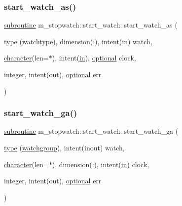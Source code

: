 \subsubsection{\texorpdfstring{start\+\_\+watch\+\_\+as()}{start\_watch\_as()}}
{\footnotesize\ttfamily \hyperlink{M__stopwatch_83_8txt_acfbcff50169d691ff02d4a123ed70482}{subroutine} m\+\_\+stopwatch\+::start\+\_\+watch\+::start\+\_\+watch\+\_\+as (\begin{DoxyParamCaption}\item[{\hyperlink{stop__watch_83_8txt_a70f0ead91c32e25323c03265aa302c1c}{type} (\hyperlink{structm__stopwatch_1_1watchtype}{watchtype}), dimension(\+:), intent(\hyperlink{M__journal_83_8txt_afce72651d1eed785a2132bee863b2f38}{in})}]{watch,  }\item[{\hyperlink{option__stopwatch_83_8txt_abd4b21fbbd175834027b5224bfe97e66}{character}(len=$\ast$), intent(\hyperlink{M__journal_83_8txt_afce72651d1eed785a2132bee863b2f38}{in}), \hyperlink{option__stopwatch_83_8txt_aa4ece75e7acf58a4843f70fe18c3ade5}{optional}}]{clock,  }\item[{integer, intent(out), \hyperlink{option__stopwatch_83_8txt_aa4ece75e7acf58a4843f70fe18c3ade5}{optional}}]{err }\end{DoxyParamCaption})\hspace{0.3cm}{\ttfamily [private]}}

\mbox{\label{interfacem__stopwatch_1_1start__watch_ae147538e6da5f0485b4b253baafebd3e}} 
\subsubsection{\texorpdfstring{start\+\_\+watch\+\_\+ga()}{start\_watch\_ga()}}
{\footnotesize\ttfamily \hyperlink{M__stopwatch_83_8txt_acfbcff50169d691ff02d4a123ed70482}{subroutine} m\+\_\+stopwatch\+::start\+\_\+watch\+::start\+\_\+watch\+\_\+ga (\begin{DoxyParamCaption}\item[{\hyperlink{stop__watch_83_8txt_a70f0ead91c32e25323c03265aa302c1c}{type} (\hyperlink{structm__stopwatch_1_1watchgroup}{watchgroup}), intent(inout)}]{watch,  }\item[{\hyperlink{option__stopwatch_83_8txt_abd4b21fbbd175834027b5224bfe97e66}{character}(len=$\ast$), dimension(\+:), intent(\hyperlink{M__journal_83_8txt_afce72651d1eed785a2132bee863b2f38}{in})}]{clock,  }\item[{integer, intent(out), \hyperlink{option__stopwatch_83_8txt_aa4ece75e7acf58a4843f70fe18c3ade5}{optional}}]{err }\end{DoxyParamCaption})\hspace{0.3cm}{\ttfamily [private]}}

